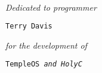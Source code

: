\renewcommand\thepage{Memoriam}
\thispagestyle{empty}
\
\vfill

\begin{center}

\it{Dedicated to programmer}

\tt{Terry Davis}

\it{for the development of}

\tt{TempleOS} \it{and} \tt{HolyC}

\end{center}

\vfill
